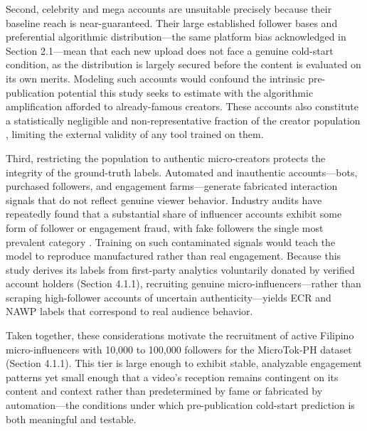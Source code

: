 Second, celebrity and mega accounts are unsuitable precisely because their baseline reach is near-guaranteed. Their large established follower bases and preferential algorithmic distribution—the same platform bias acknowledged in Section 2.1---mean that each new upload does not face a genuine cold-start condition, as the distribution is largely secured before the content is evaluated on its own merits. Modeling such accounts would confound the intrinsic pre-publication potential this study seeks to estimate with the algorithmic amplification afforded to already-famous creators. These accounts also constitute a statistically negligible and non-representative fraction of the creator population \cite{creator_economy_2027}, limiting the external validity of any tool trained on them.

Third, restricting the population to authentic micro-creators protects the integrity of the ground-truth labels. Automated and inauthentic accounts—bots, purchased followers, and engagement farms—generate fabricated interaction signals that do not reflect genuine viewer behavior. Industry audits have repeatedly found that a substantial share of influencer accounts exhibit some form of follower or engagement fraud, with fake followers the single most prevalent category \cite{HypeAuditor_2025}. Training on such contaminated signals would teach the model to reproduce manufactured rather than real engagement. Because this study derives its labels from first-party analytics voluntarily donated by verified account holders (Section 4.1.1), recruiting genuine micro-influencers—rather than scraping high-follower accounts of uncertain authenticity—yields ECR and NAWP labels that correspond to real audience behavior.

Taken together, these considerations motivate the recruitment of active Filipino micro-influencers with 10,000 to 100,000 followers for the MicroTok-PH dataset (Section 4.1.1). This tier is large enough to exhibit stable, analyzable engagement patterns yet small enough that a video's reception remains contingent on its content and context rather than predetermined by fame or fabricated by automation—the conditions under which pre-publication cold-start prediction is both meaningful and testable.

